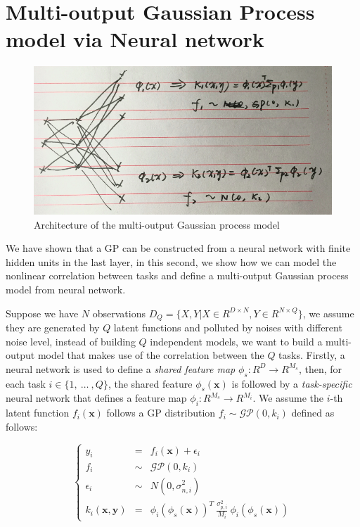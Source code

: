 \section{Multi-output Gaussian Process model via Neural network}

\begin{figure}[!htb]
    \centering
    \includegraphics[width=\columnwidth]{./img/NN-MOGP.png}
    \caption{Architecture of the multi-output Gaussian process model}
    \label{fig:MONNGP}
\end{figure}

We have shown that a GP can be constructed from a neural network with finite hidden units in the last layer, in this second, we show how we can model the nonlinear correlation between tasks and define a multi-output Gaussian process model from neural network. 

Suppose we have $N$ observations $D_Q = \{X, Y | X \in R^{D \times N}, Y \in R^{N \times Q}\}$, we assume they are generated by $Q$ latent functions and polluted by noises with different noise level, instead of building $Q$ independent models, we want to build a multi-output model that makes use of the correlation between the $Q$ tasks. Firstly, a neural network is used to define a \emph{shared feature map} $\phi_s : R^D \rightarrow R^{M_s}$, then, for each task $i \in \{1,~\dots~,Q\}$, the shared feature $\phi_s(\bm{x})$ is followed by a \emph{task-specific} neural network that defines a feature map $\phi_i : R^{M_s} \rightarrow R^{M_i}$. We assume the $i$-th latent function $f_i(\bm{x})$ follows a GP distribution $f_i \sim \mathcal{GP}(0, k_i)$ defined as follows:

\begin{equation}
    \label{eq:mo_kernel}
    \left\{
    \begin{array}{lll}
        y_i                 &=&    f_i(\bm{x}) + \epsilon_i  \\
        f_i                 &\sim& \mathcal{GP}(0, k_i)      \\
        \epsilon_i          &\sim& N(0, \sigma_{n, i}^2)     \\
        k_i(\bm{x}, \bm{y}) &=&    \phi_i(\phi_s(\bm{x}))^T~\frac{\sigma_{p, i}^2}{M_i}~\phi_i(\phi_s(\bm{x}))
    \end{array}
    \right.
\end{equation}

